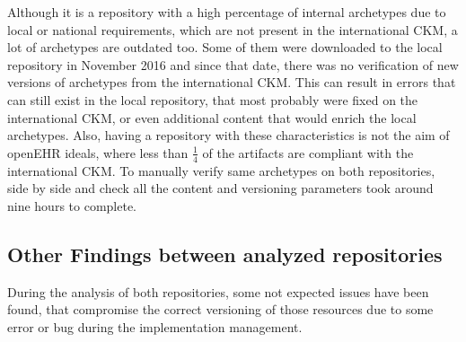 \documentclass[mim_thesis.tex]{subfiles}
\begin{document}
Although it is a repository with a high percentage of internal archetypes due to local or national requirements, which are not present in the international CKM, a lot of archetypes are outdated too. Some of them were downloaded to the local repository in November 2016 and since that date, there was no verification of new versions of archetypes from the international CKM. This can result in errors that can still exist in the local repository, that most probably were fixed on the international 
CKM, or even additional content that would enrich the local archetypes. Also, having a repository with these characteristics is not the aim of openEHR ideals, where less than \( \frac{1}{4} \) of the artifacts are compliant with the international CKM. To manually verify same archetypes on both repositories, side by side and check all the content and versioning parameters took around nine hours to complete. 

\subsection{Other Findings between analyzed repositories}
During the analysis of both repositories, some not expected issues have been found, that compromise the correct versioning of those resources due to some error or bug during the implementation management.
\end{document}
